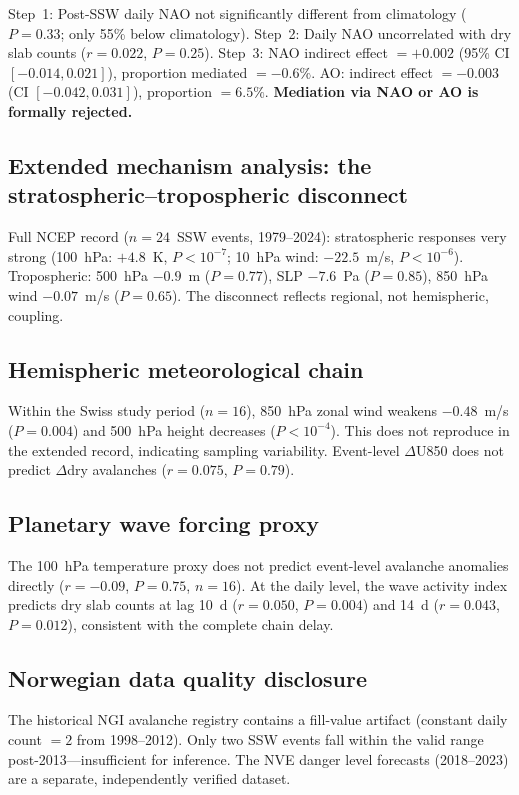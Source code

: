 \documentclass[11pt,letterpaper]{article}
\begin{document}
Step~1: Post-SSW daily NAO not significantly different from climatology ($P = 0.33$; only 55\% below climatology). Step~2: Daily NAO uncorrelated with dry slab counts ($r = 0.022$, $P = 0.25$). Step~3: NAO indirect effect $= +0.002$ (95\% CI $[-0.014, 0.021]$), proportion mediated $= -0.6\%$. AO: indirect effect $= -0.003$ (CI $[-0.042, 0.031]$), proportion $= 6.5\%$. \textbf{Mediation via NAO or AO is formally rejected.}

\subsection{Extended mechanism analysis: the stratospheric--tropospheric disconnect}

Full NCEP record ($n = 24$~SSW events, 1979--2024): stratospheric responses very strong (100~hPa: $+4.8$~K, $P < 10^{-7}$; 10~hPa wind: $-22.5$~m/s, $P < 10^{-6}$). Tropospheric: 500~hPa $-0.9$~m ($P = 0.77$), SLP $-7.6$~Pa ($P = 0.85$), 850~hPa wind $-0.07$~m/s ($P = 0.65$). The disconnect reflects regional, not hemispheric, coupling.

\subsection{Hemispheric meteorological chain}

Within the Swiss study period ($n = 16$), 850~hPa zonal wind weakens $-0.48$~m/s ($P = 0.004$) and 500~hPa height decreases ($P < 10^{-4}$). This does not reproduce in the extended record, indicating sampling variability. Event-level $\Delta$U850 does not predict $\Delta$dry avalanches ($r = 0.075$, $P = 0.79$).

\subsection{Planetary wave forcing proxy}

The 100~hPa temperature proxy does not predict event-level avalanche anomalies directly ($r = -0.09$, $P = 0.75$, $n = 16$). At the daily level, the wave activity index predicts dry slab counts at lag 10~d ($r = 0.050$, $P = 0.004$) and 14~d ($r = 0.043$, $P = 0.012$), consistent with the complete chain delay.

\subsection{Norwegian data quality disclosure}

The historical NGI avalanche registry contains a fill-value artifact (constant daily count $= 2$ from 1998--2012). Only two SSW events fall within the valid range post-2013---insufficient for inference. The NVE danger level forecasts (2018--2023) are a separate, independently verified dataset.
\end{document}
